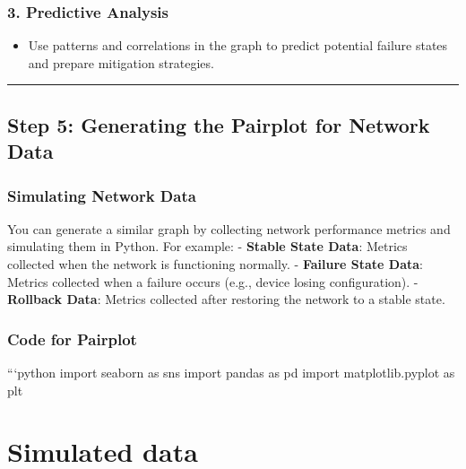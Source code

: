 \documentclass[11pt]{article}
\providecommand{\tightlist}{%
      \setlength{\itemsep}{0pt}\setlength{\parskip}{0pt}}
\begin{document}
\hypertarget{predictive-analysis}{%
\subsubsection{\texorpdfstring{\textbf{3. Predictive
Analysis}}{3. Predictive Analysis}}\label{predictive-analysis}}

\begin{itemize}
\tightlist
\item
  Use patterns and correlations in the graph to predict potential
  failure states and prepare mitigation strategies.
\end{itemize}

\begin{center}\rule{0.5\linewidth}{0.5pt}\end{center}

\hypertarget{step-5-generating-the-pairplot-for-network-data}{%
\subsection{\texorpdfstring{\textbf{Step 5: Generating the Pairplot for
Network
Data}}{Step 5: Generating the Pairplot for Network Data}}\label{step-5-generating-the-pairplot-for-network-data}}

\hypertarget{simulating-network-data}{%
\subsubsection{\texorpdfstring{\textbf{Simulating Network
Data}}{Simulating Network Data}}\label{simulating-network-data}}

You can generate a similar graph by collecting network performance
metrics and simulating them in Python. For example: - \textbf{Stable
State Data}: Metrics collected when the network is functioning normally.
- \textbf{Failure State Data}: Metrics collected when a failure occurs
(e.g., device losing configuration). - \textbf{Rollback Data}: Metrics
collected after restoring the network to a stable state.

\hypertarget{code-for-pairplot}{%
\subsubsection{\texorpdfstring{\textbf{Code for
Pairplot}}{Code for Pairplot}}\label{code-for-pairplot}}

```python import seaborn as sns import pandas as pd import
matplotlib.pyplot as plt

\hypertarget{simulated-data}{%
\section{Simulated data}\label{simulated-data}}
\end{document}
